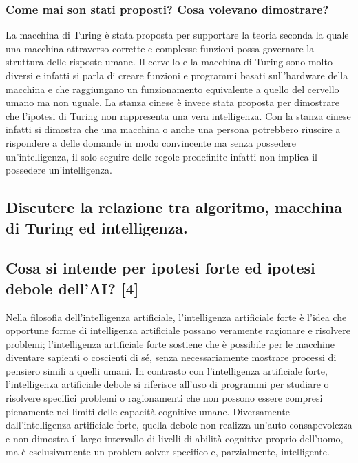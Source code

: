 \documentclass[\main/main.tex]{subfiles}
\begin{document}
\subsubsection{Come mai son stati proposti? Cosa volevano dimostrare?}
La macchina di Turing è stata proposta per supportare la teoria seconda la quale una macchina attraverso corrette e complesse funzioni possa governare la struttura delle risposte umane. Il cervello e la macchina di Turing sono molto diversi e infatti si parla di creare funzioni e programmi basati sull’hardware della macchina e che raggiungano un funzionamento equivalente a quello del cervello umano ma non uguale.
La stanza cinese è invece stata proposta per dimostrare che l’ipotesi di Turing non rappresenta una vera intelligenza. Con la stanza cinese infatti si dimostra che una macchina o anche una persona potrebbero riuscire a rispondere a delle domande in modo convincente ma senza possedere un’intelligenza, il solo seguire delle regole predefinite infatti non implica il possedere un’intelligenza.
\subsection{Discutere la relazione tra algoritmo, macchina di Turing ed intelligenza.}
\subsection{Cosa si intende per ipotesi forte ed ipotesi debole dell'AI? [4]}
Nella filosofia dell'intelligenza artificiale, l'intelligenza artificiale forte è l'idea che opportune forme di intelligenza artificiale possano veramente ragionare e risolvere problemi; l'intelligenza artificiale forte sostiene che è possibile per le macchine diventare sapienti o coscienti di sé, senza necessariamente mostrare processi di pensiero simili a quelli umani.
In contrasto con l'intelligenza artificiale forte, l'intelligenza artificiale debole si riferisce all'uso di programmi per studiare o risolvere specifici problemi o ragionamenti che non possono essere compresi pienamente nei limiti delle capacità cognitive umane. Diversamente dall'intelligenza artificiale forte, quella debole non realizza un'auto-consapevolezza e non dimostra il largo intervallo di livelli di abilità cognitive proprio dell'uomo, ma è esclusivamente un problem-solver specifico e, parzialmente, intelligente.
\end{document}
